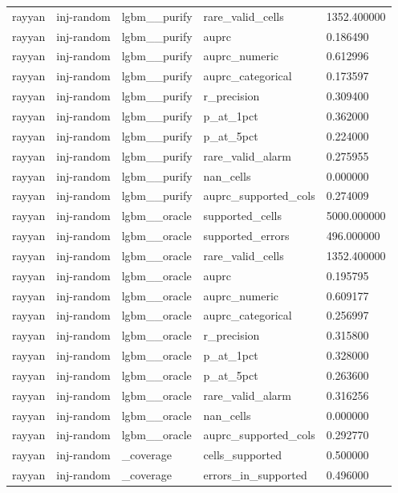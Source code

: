 \begin{tabular}{lllll}
rayyan & inj-random & lgbm\_\_purify & rare\_valid\_cells & 1352.400000 \\
rayyan & inj-random & lgbm\_\_purify & auprc & 0.186490 \\
rayyan & inj-random & lgbm\_\_purify & auprc\_numeric & 0.612996 \\
rayyan & inj-random & lgbm\_\_purify & auprc\_categorical & 0.173597 \\
rayyan & inj-random & lgbm\_\_purify & r\_precision & 0.309400 \\
rayyan & inj-random & lgbm\_\_purify & p\_at\_1pct & 0.362000 \\
rayyan & inj-random & lgbm\_\_purify & p\_at\_5pct & 0.224000 \\
rayyan & inj-random & lgbm\_\_purify & rare\_valid\_alarm & 0.275955 \\
rayyan & inj-random & lgbm\_\_purify & nan\_cells & 0.000000 \\
rayyan & inj-random & lgbm\_\_purify & auprc\_supported\_cols & 0.274009 \\
rayyan & inj-random & lgbm\_\_oracle & supported\_cells & 5000.000000 \\
rayyan & inj-random & lgbm\_\_oracle & supported\_errors & 496.000000 \\
rayyan & inj-random & lgbm\_\_oracle & rare\_valid\_cells & 1352.400000 \\
rayyan & inj-random & lgbm\_\_oracle & auprc & 0.195795 \\
rayyan & inj-random & lgbm\_\_oracle & auprc\_numeric & 0.609177 \\
rayyan & inj-random & lgbm\_\_oracle & auprc\_categorical & 0.256997 \\
rayyan & inj-random & lgbm\_\_oracle & r\_precision & 0.315800 \\
rayyan & inj-random & lgbm\_\_oracle & p\_at\_1pct & 0.328000 \\
rayyan & inj-random & lgbm\_\_oracle & p\_at\_5pct & 0.263600 \\
rayyan & inj-random & lgbm\_\_oracle & rare\_valid\_alarm & 0.316256 \\
rayyan & inj-random & lgbm\_\_oracle & nan\_cells & 0.000000 \\
rayyan & inj-random & lgbm\_\_oracle & auprc\_supported\_cols & 0.292770 \\
rayyan & inj-random & \_coverage & cells\_supported & 0.500000 \\
rayyan & inj-random & \_coverage & errors\_in\_supported & 0.496000 \\

\end{tabular}
